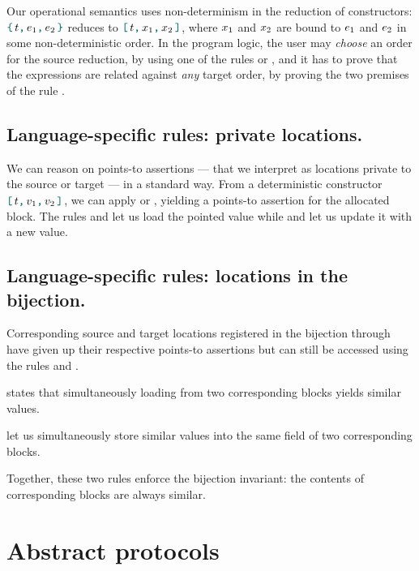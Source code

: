 Our operational semantics uses non-determinism in the reduction of constructors: $\datalangBlock{\datalangTag}{\datalangExpr_1}{\datalangExpr_2}$ reduces to $\datalangBlockDet{\datalangTag}{\datalangVar_1}{\datalangVar_2}$, where $\datalangVar_1$ and $\datalangVar_2$ are bound to $\datalangExpr_1$ and $\datalangExpr_2$ in some non-deterministic order.
In the program logic, the user may \emph{choose} an order for the source reduction, by using one of the rules  or , and it has to prove that the expressions are related against \emph{any} target order, by proving the two premises of the rule .

\subsection{Language-specific rules: private locations.}
We can reason on points-to assertions --- that we interpret as locations private to the source or target --- in a standard way.
From a deterministic constructor $\datalangBlockDet{\datalangTag}{\datalangVal_1}{\datalangVal_2}$, we can apply  or , yielding a points-to assertion for the allocated block.
The rules  and  let us load the pointed value while  and  let us update it with a new value.

\subsection{Language-specific rules: locations in the bijection.}
Corresponding source and target locations registered in the bijection through  have given up their respective points-to assertions but can still be accessed using the rules  and .

 states that simultaneously loading from two corresponding blocks yields similar values.

 let us simultaneously store similar values into the same field of two corresponding blocks.

Together, these two rules enforce the bijection invariant: the contents of corresponding blocks are always similar.

\section{Abstract protocols} \label{sec:protocols} \label{subsec:protocols}

